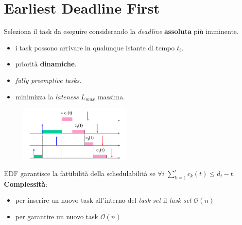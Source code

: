 \newpage
\section{Earliest Deadline First}
Seleziona il task da eseguire considerando la \textit{deadline} \textbf{assoluta} più imminente.
\begin{itemize}
    \item i task possono arrivare in qualunque istante di tempo $t_i$.
    \item priorità \textbf{dinamiche}.
    \item \textit{fully preemptive tasks}.
    \item minimizza la \textit{lateness} $L_{max}$ massima.
\end{itemize}
\begin{figure}[h]
    \centering
    \includegraphics[width=0.5\textwidth]{img/edf_1}
\end{figure}
EDF garantisce la fattibilità della schedulabilità se $\forall i \; \sum_{k = 1}^i c_k(t) \leq d_i - t$. \\
\textbf{Complessità}:
\begin{itemize}
    \item per inserire un nuovo task all'interno del \textit{task set} il \textit{task set} $\mathcal{O}(n)$
    \item per garantire un nuovo task $\mathcal{O}(n)$
\end{itemize}
